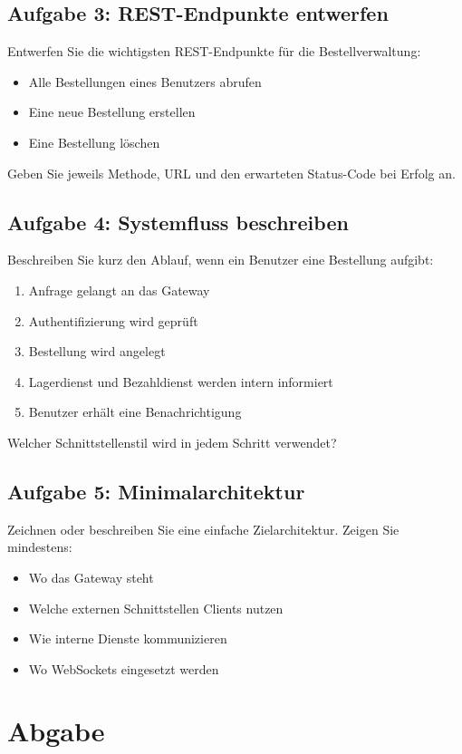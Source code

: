 \documentclass[a4paper,12pt]{article}
\begin{document}
\subsection*{Aufgabe 3: REST-Endpunkte entwerfen}
Entwerfen Sie die wichtigsten REST-Endpunkte für die Bestellverwaltung:
\begin{itemize}
\item Alle Bestellungen eines Benutzers abrufen
\item Eine neue Bestellung erstellen
\item Eine Bestellung löschen
\end{itemize}
Geben Sie jeweils Methode, URL und den erwarteten Status-Code bei Erfolg an.

\subsection*{Aufgabe 4: Systemfluss beschreiben}
Beschreiben Sie kurz den Ablauf, wenn ein Benutzer eine Bestellung aufgibt:
\begin{enumerate}
\item Anfrage gelangt an das Gateway
\item Authentifizierung wird geprüft
\item Bestellung wird angelegt
\item Lagerdienst und Bezahldienst werden intern informiert
\item Benutzer erhält eine Benachrichtigung
\end{enumerate}
Welcher Schnittstellenstil wird in jedem Schritt verwendet?

\subsection*{Aufgabe 5: Minimalarchitektur}
Zeichnen oder beschreiben Sie eine einfache Zielarchitektur.
Zeigen Sie mindestens:
\begin{itemize}
\item Wo das Gateway steht
\item Welche externen Schnittstellen Clients nutzen
\item Wie interne Dienste kommunizieren
\item Wo WebSockets eingesetzt werden
\end{itemize}

\section*{Abgabe}
\end{document}
